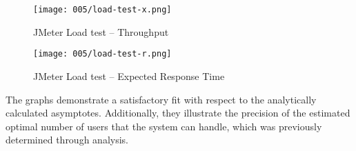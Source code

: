 \begin{figure}[h]
	\centering
	\texttt{[image: 005/load-test-x.png]}
	\caption{JMeter Load test -- Throughput}
\end{figure}

\clearpage

\begin{figure}[h]
	\centering
	\texttt{[image: 005/load-test-r.png]}
	\caption{JMeter Load test -- Expected Response Time}
\end{figure}

The graphs demonstrate a satisfactory fit with respect to the analytically calculated asymptotes.
Additionally, they illustrate the precision of the estimated optimal number of users that the system can handle, which was previously determined through analysis.

